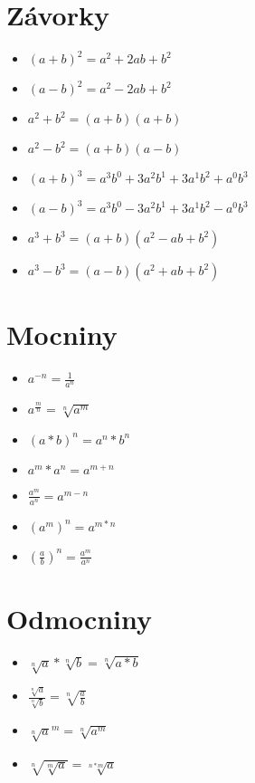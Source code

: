 \documentclass{article}
\begin{document}
	\section*{Závorky}
	\begin{multicols}{2}
		\begin{itemize}
			\item $(a+b)^2 =a^2 + 2ab + b^2$
			\item $(a-b)^2 =a^2 - 2ab + b^2$
			\item $a^2 + b^2=(a+b)(a+b)$
			\item $a^2 - b^2=(a+b)(a-b)$
	\columnbreak
			\item $(a+b)^3 =a^3 b^0 +3a^2 b^1 +3a^1 b^2 + a^0 b^3$
			\item $(a-b)^3 =a^3 b^0 -3a^2 b^1 +3a^1 b^2 - a^0 b^3$
			\item $a^3 + b^3 =(a+b)(a^2 - ab + b^2 )$
			\item $a^3 - b^3 =(a-b)(a^2 + ab + b^2 )$
		\end{itemize}
	\end{multicols}
	\section*{Mocniny}
	\begin{multicols}{2}
		\begin{itemize}
			\item $a^{-n}=\frac{1}{a^n}$
			\item $a^{\frac{m}{n}}=\sqrt[n]{a^m}$
			\item $(a*b)^n =a^n *b^n$
			\item $a^m * a^n = a^{m+n}$
		\columnbreak
			\item $\frac{a^m}{a^n}=a^{m-n}$
			\item $(a^m)^n = a^{m*n}$
			\item $\left(\frac{a}{b}\right)^n = \frac{a^m}{a^n}$
		\end{itemize}
	\end{multicols}
	\section*{Odmocniny}
	\begin{multicols}{2}
		\begin{itemize}
			\item $\sqrt[n]{a}*\sqrt[n]{b}=\sqrt[n]{a*b}$
			\item $\frac{\sqrt[n]{a}}{\sqrt[n]{b}}=\sqrt[n]{\frac{a}{b}}$
		\columnbreak
			\item $\sqrt[n]{a}^m =\sqrt[n]{a^m}$
			\item $\sqrt[n]{\sqrt[m]{a}}=\sqrt[n*m]{a}$
		\end{itemize}
	\end{multicols}
\end{document}

